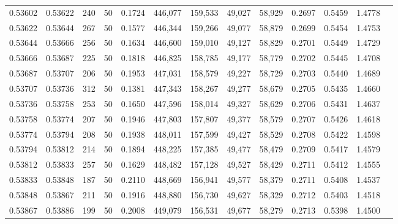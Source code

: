 \begin{tabular}{rrrrrrrrrrrrr}
0.53602 & 0.53622 &   240 &  50 &                                     0.1724 & 446,077 & 159,533 &  49,027 &  58,929 & 0.2697 & 0.5459 & 1.4778 \\
0.53622 & 0.53644 &   267 &  50 &                                     0.1577 & 446,344 & 159,266 &  49,077 &  58,879 & 0.2699 & 0.5454 & 1.4753 \\
0.53644 & 0.53666 &   256 &  50 &                                     0.1634 & 446,600 & 159,010 &  49,127 &  58,829 & 0.2701 & 0.5449 & 1.4729 \\
0.53666 & 0.53687 &   225 &  50 &                                     0.1818 & 446,825 & 158,785 &  49,177 &  58,779 & 0.2702 & 0.5445 & 1.4708 \\
0.53687 & 0.53707 &   206 &  50 &                                     0.1953 & 447,031 & 158,579 &  49,227 &  58,729 & 0.2703 & 0.5440 & 1.4689 \\
0.53707 & 0.53736 &   312 &  50 &                                     0.1381 & 447,343 & 158,267 &  49,277 &  58,679 & 0.2705 & 0.5435 & 1.4660 \\
0.53736 & 0.53758 &   253 &  50 &                                     0.1650 & 447,596 & 158,014 &  49,327 &  58,629 & 0.2706 & 0.5431 & 1.4637 \\
0.53758 & 0.53774 &   207 &  50 &                                     0.1946 & 447,803 & 157,807 &  49,377 &  58,579 & 0.2707 & 0.5426 & 1.4618 \\
0.53774 & 0.53794 &   208 &  50 &                                     0.1938 & 448,011 & 157,599 &  49,427 &  58,529 & 0.2708 & 0.5422 & 1.4598 \\
0.53794 & 0.53812 &   214 &  50 &                                     0.1894 & 448,225 & 157,385 &  49,477 &  58,479 & 0.2709 & 0.5417 & 1.4579 \\
0.53812 & 0.53833 &   257 &  50 &                                     0.1629 & 448,482 & 157,128 &  49,527 &  58,429 & 0.2711 & 0.5412 & 1.4555 \\
0.53833 & 0.53848 &   187 &  50 &                                     0.2110 & 448,669 & 156,941 &  49,577 &  58,379 & 0.2711 & 0.5408 & 1.4537 \\
0.53848 & 0.53867 &   211 &  50 &                                     0.1916 & 448,880 & 156,730 &  49,627 &  58,329 & 0.2712 & 0.5403 & 1.4518 \\
0.53867 & 0.53886 &   199 &  50 &                                     0.2008 & 449,079 & 156,531 &  49,677 &  58,279 & 0.2713 & 0.5398 & 1.4500 \\

\end{tabular}
